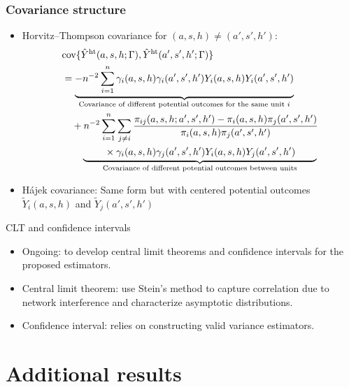 \documentclass[aspectratio=169]{beamer}
\newcommand{\cov}{\textup{cov}}
\newcommand{\sumi}{\sum_{i=1}^n}
\newcommand{\horthom}{\textup{ht}}
\newcommand{\pscore}[1]{\pi_{#1}}
\begin{document}
\begin{frame}
\frametitle{Covariance structure}
\begin{itemize}
    \item Horvitz--Thompson covariance
    for $(a,s,h) \neq (a',s',h')$:
    \pause 
    \begin{align*}
    &\cov\{\hat{Y}^{\horthom}(a,s,h;\Gamma), \hat{Y}^{\horthom}(a',s',h';\Gamma)\} \\
    &= \underbrace{-n^{-2}\sumi \gamma_i(a,s,h)\gamma_i(a',s',h')Y_i(a,s,h)Y_i(a',s',h')}_{\text{Covariance of different potential outcomes for the same unit $i$}} \\
    &\quad + n^{-2}\sumi\sum_{j\neq i}\frac{\pscore{ij}(a,s,h;a',s',h') - \pscore{i}(a,s,h)\pscore{j}(a',s',h')}{\pscore{i}(a,s,h)\pscore{j}(a',s',h')} \\
    &\qquad \underbrace{\phantom{hello}\times \gamma_i(a,s,h)\gamma_j(a',s',h')Y_i(a,s,h)Y_j(a',s',h')\phantom{hello}}_{\text{Covariance of different potential outcomes between units}}
    \end{align*}

    \pause 
    \item {H\'{a}jek covariance:} Same form but with centered potential outcomes $\tilde{Y}_i(a,s,h)$ and $\tilde{Y}_j(a',s',h')$
\end{itemize}

\end{frame}

\begin{frame}{CLT and confidence intervals}
    \begin{itemize}
        \item Ongoing: to develop central limit theorems and confidence intervals for the proposed estimators.

        \item Central limit theorem: use Stein's method to capture correlation due to network interference and characterize asymptotic distributions.

        \item Confidence interval: relies on constructing valid variance estimators. 
    \end{itemize}
\end{frame}

\section{Additional results}
\end{document}
